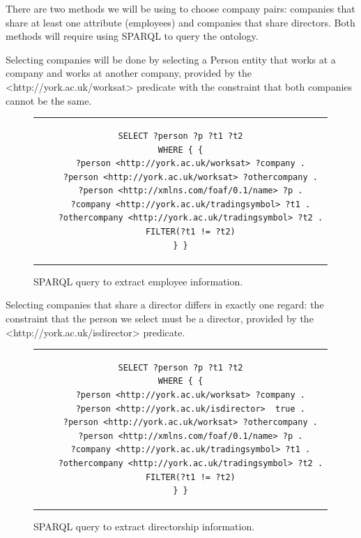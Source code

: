 \documentclass{UoYCSproject}
\begin{document}
There are two methods we will be using to choose company pairs: companies that share at least one attribute (employees) and companies that share directors. Both methods will require using SPARQL to query the ontology.

Selecting companies will be done by selecting a Person entity that works at a company and works at another company, provided by the <http://york.ac.uk/worksat> predicate with the constraint that both companies cannot be the same.\newpage

\begin{figure}[h]
\begin{center}
\begin{tabular}{c}
\begin{lstlisting}[basicstyle=\small, columns=fullflexible]
SELECT ?person ?p ?t1 ?t2
WHERE { {
    ?person <http://york.ac.uk/worksat> ?company .
    ?person <http://york.ac.uk/worksat> ?othercompany .
    ?person <http://xmlns.com/foaf/0.1/name> ?p .
    ?company <http://york.ac.uk/tradingsymbol> ?t1 .
    ?othercompany <http://york.ac.uk/tradingsymbol> ?t2 .
    FILTER(?t1 != ?t2)
} }
\end{lstlisting}
\end{tabular}
\end{center}
\caption{SPARQL query to extract employee information.}
\end{figure}

Selecting companies that share a director differs in exactly one regard: the constraint that the person we select must be a director, provided by the <http://york.ac.uk/isdirector> predicate.

\begin{figure}[h]
\begin{center}
\begin{tabular}{c}
\begin{lstlisting}[basicstyle=\small, columns=fullflexible]
SELECT ?person ?p ?t1 ?t2
WHERE { {
    ?person <http://york.ac.uk/worksat> ?company .
    ?person <http://york.ac.uk/isdirector>  true .
    ?person <http://york.ac.uk/worksat> ?othercompany .
    ?person <http://xmlns.com/foaf/0.1/name> ?p .
    ?company <http://york.ac.uk/tradingsymbol> ?t1 .
    ?othercompany <http://york.ac.uk/tradingsymbol> ?t2 .
    FILTER(?t1 != ?t2)
} }
\end{lstlisting}
\end{tabular}
\end{center}
\caption{SPARQL query to extract directorship information.}
\end{figure}
\end{document}
